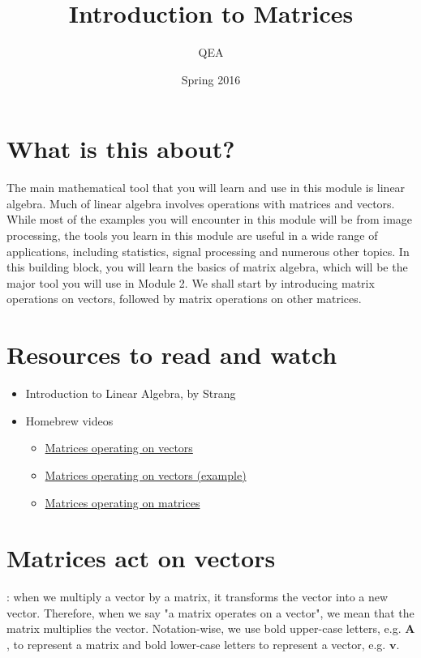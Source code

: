 \documentclass{tufte-handout}
\title{Introduction to Matrices}
\author{QEA}
\date{Spring 2016}
\begin{document}
\maketitle
\thispagestyle{firstpage}

\section{What is this about?}

The main mathematical tool that you will learn and use in this module is linear algebra. Much of linear algebra involves operations with matrices and vectors. While most of the examples you will encounter in this module will be from image processing, the tools you learn in this module are useful in a wide range of applications, including statistics, signal processing and numerous other topics. In this building block, you will learn the basics of matrix algebra, which will be the major tool you will use in Module 2. We shall start by introducing matrix operations on vectors, followed by matrix operations on other matrices. 

\section{Resources to read and watch}

\begin{itemize}
\item Introduction to Linear Algebra, by Strang
\item Homebrew videos
\begin{itemize}
\item \href{https://youtu.be/XSNHG1Vkcik}{Matrices operating on vectors}
\item \href{https://youtu.be/T5Larkrb430}{Matrices operating on vectors (example)}
\item \href{https://youtu.be/_cQq85Th6nI}{Matrices operating on matrices}
\end{itemize}
\end{itemize}


\section{Matrices act on vectors}
: when we multiply a vector by a matrix, it transforms the vector into a new vector. Therefore, when we say "a matrix operates on a vector", we mean that the matrix multiplies the vector. Notation-wise, we use bold upper-case letters, e.g. $\mathbf{A}$, to represent a matrix and bold lower-case letters to represent a vector, e.g. $\mathbf{v}$.
\end{document}
